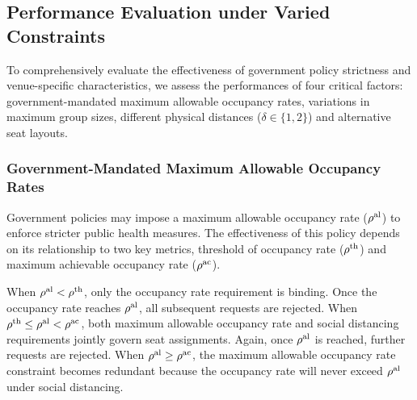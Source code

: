 
\subsection{Performance Evaluation under Varied Constraints}\label{perf_constraints}
To comprehensively evaluate the effectiveness of government policy strictness and venue-specific characteristics, we assess the performances of four critical factors: government-mandated maximum allowable occupancy rates, variations in maximum group sizes, different physical distances ($\delta \in \{1,2\}$) and alternative seat layouts.


\subsubsection{Government-Mandated Maximum Allowable Occupancy Rates}

Government policies may impose a maximum allowable occupancy rate ($\rho^{\textup{al}}$) to enforce stricter public health measures. The effectiveness of this policy depends on its relationship to two key metrics, threshold of occupancy rate ($\rho^{\textup{th}}$) and maximum achievable occupancy rate ($\rho^{\textup{ac}}$).

When $\rho^{\textup{al}} < \rho^{\textup{th}}$, only the occupancy rate requirement is binding. Once the occupancy rate reaches $\rho^{\textup{al}}$, all subsequent requests are rejected. When $\rho^{\textup{th}} \leq \rho^{\textup{al}} < \rho^{\textup{ac}}$, both maximum allowable occupancy rate and social distancing requirements jointly govern seat assignments. Again, once $\rho^{\textup{al}}$ is reached, further requests are rejected. When $\rho^{\textup{al}} \geq \rho^{\textup{ac}}$, the maximum allowable occupancy rate constraint becomes redundant because the occupancy rate will never exceed $\rho^{\textup{al}}$ under social distancing.


